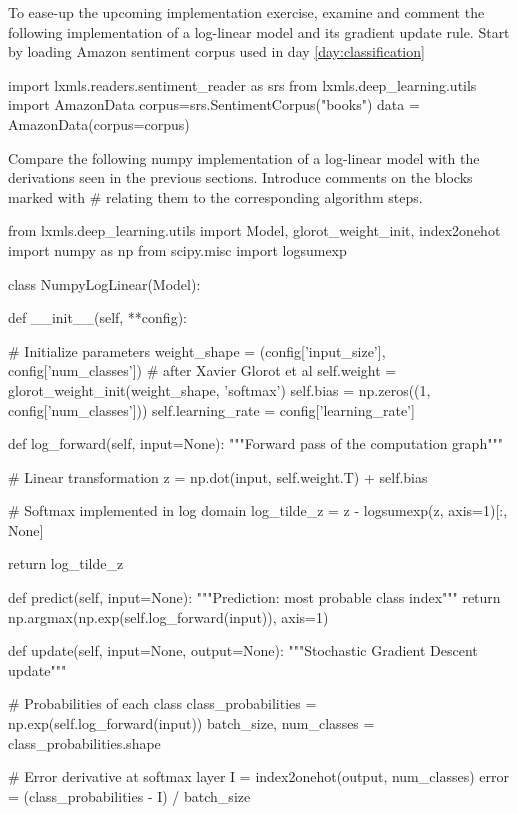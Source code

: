 \begin{exercise}
\label{exercise:exerciseNumpy1}
To ease-up the upcoming implementation exercise, examine and comment the following implementation of a log-linear model and its gradient update rule.
Start by loading Amazon sentiment corpus used in day \ref{day:classification}
\begin{python}
import lxmls.readers.sentiment_reader as srs
from lxmls.deep_learning.utils import AmazonData
corpus=srs.SentimentCorpus("books")
data = AmazonData(corpus=corpus)
\end{python}
Compare the following numpy implementation of a log-linear model with the derivations seen in the previous sections. Introduce comments on the blocks marked with \# relating them to the corresponding algorithm steps.
\begin{python}
from lxmls.deep_learning.utils import Model, glorot_weight_init, index2onehot
import numpy as np
from scipy.misc import logsumexp

class NumpyLogLinear(Model):

    def __init__(self, **config):

        # Initialize parameters
        weight_shape = (config['input_size'], config['num_classes'])
        # after Xavier Glorot et al
        self.weight = glorot_weight_init(weight_shape, 'softmax')
        self.bias = np.zeros((1, config['num_classes']))
        self.learning_rate = config['learning_rate']

    def log_forward(self, input=None):
        """Forward pass of the computation graph"""

        # Linear transformation
        z = np.dot(input, self.weight.T) + self.bias

        # Softmax implemented in log domain
        log_tilde_z = z - logsumexp(z, axis=1)[:, None]

        return log_tilde_z

    def predict(self, input=None):
        """Prediction: most probable class index"""
        return np.argmax(np.exp(self.log_forward(input)), axis=1)

    def update(self, input=None, output=None):
        """Stochastic Gradient Descent update"""

        # Probabilities of each class
        class_probabilities = np.exp(self.log_forward(input))
        batch_size, num_classes = class_probabilities.shape

        # Error derivative at softmax layer
        I = index2onehot(output, num_classes)
        error = (class_probabilities - I) / batch_size


\end{python}
\end{exercise}
